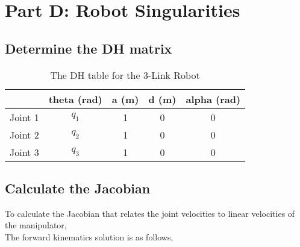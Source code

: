 \section{Part D: Robot Singularities}
\subsection{Determine the DH matrix}
\begin{table}[H]
    \centering
    \begin{tabular}{|c|c|c|c|c|}
        \hline
                & \textbf{theta (rad)} & \textbf{a (m)} & \textbf{d (m)} & \textbf{alpha (rad)} \\ \hline
        Joint 1 & $q_{1}$              & 1              & 0              & 0                    \\ \hline
        Joint 2 & $q_{2}$              & 1              & 0              & 0                    \\ \hline
        Joint 3 & $q_{3}$              & 1              & 0              & 0                    \\ \hline
    \end{tabular}
    \caption{The DH table for the 3-Link Robot}
    \label{table:3-Link Robot}
\end{table}
\subsection{Calculate the Jacobian}

To calculate the Jacobian that relates the joint velocities to linear velocities of the manipulator,
\\
The forward kinematics solution is as follows,

